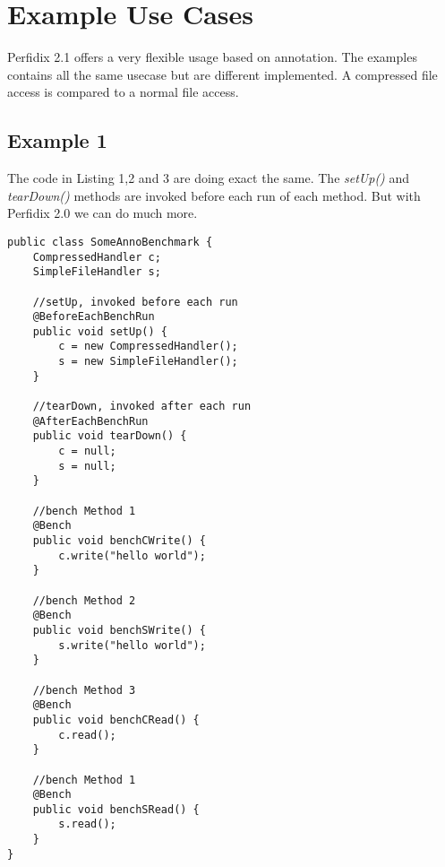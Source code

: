 \documentclass[12pt]{article}
\begin{document}
\section{Example Use Cases}
Perfidix 2.1 offers a very flexible usage based on annotation. The examples contains all the same usecase but are different implemented. A compressed file access is compared to a normal file access.
\subsection{Example 1}
The code in Listing 1,2 and 3 are doing exact the same. The \emph{setUp()} and \emph{tearDown()} methods are invoked before each run of each method. But with Perfidix 2.0 we can do much more.
\begin{lstlisting}[caption=Perfidix 2.0]
public class SomeAnnoBenchmark {
	CompressedHandler c;
	SimpleFileHandler s;

	//setUp, invoked before each run
	@BeforeEachBenchRun
	public void setUp() {
		c = new CompressedHandler();
		s = new SimpleFileHandler();
	}

	//tearDown, invoked after each run
	@AfterEachBenchRun
	public void tearDown() {
		c = null;
		s = null;
	}

	//bench Method 1
	@Bench
	public void benchCWrite() {
		c.write("hello world");
	}

	//bench Method 2
	@Bench
	public void benchSWrite() {
		s.write("hello world");
	}

	//bench Method 3
	@Bench
	public void benchCRead() {
		c.read();
	}

	//bench Method 1
	@Bench
	public void benchSRead() {
		s.read();
	}
}
\end{lstlisting}
\end{document}
